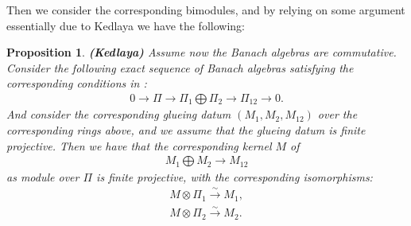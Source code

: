 \documentclass[12pt]{amsart}
\newtheorem{proposition}[theorem]{Proposition}
\theoremstyle{definition}
\numberwithin{equation}{section}
\begin{document}
\indent Then we consider the corresponding bimodules, and by relying on some argument essentially due to Kedlaya we have the following:


\begin{proposition} \mbox{\bf{(Kedlaya)}} \label{proposition5.11con}
Assume now the Banach algebras are commutative. Consider the following exact sequence of Banach algebras satisfying the corresponding conditions in \cite[Definition 2.7.3 (a),(b)]{KL1}:
\begin{align}
0\rightarrow {\Pi}\rightarrow \Pi_1\bigoplus \Pi_2\rightarrow \Pi_{12}\rightarrow 0.	
\end{align}
And consider the corresponding glueing datum $(M_1,M_2,M_{12})$ over the corresponding rings above, and we assume that the glueing datum is finite projective. Then we have that the corresponding kernel $M$ of
\begin{align}
M_1\bigoplus M_2\rightarrow M_{12}	
\end{align}
as module over $\Pi$ is finite projective, with the corresponding isomorphisms:
\begin{align}
M\otimes \Pi_1 \overset{\sim}{\rightarrow}	M_1,\\
M\otimes \Pi_2 \overset{\sim}{\rightarrow}	M_2.
\end{align}

\end{proposition}
\end{document}
